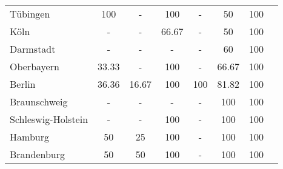 \begin{table}[H]
\begin{tabularx}{\textwidth}{Xccccccc}
            Tübingen & 100 & - & 100 & - & 50 & 100 \\
            Köln & - & - & 66.67 & - & 50 & 100 \\
            Darmstadt & - & - & - & - & 60 & 100 \\
            Oberbayern & 33.33 & - & 100 & - & 66.67 & 100 \\
            Berlin & 36.36 & 16.67 & 100 & 100 & 81.82 & 100 \\
            Braunschweig & - & - & - & - & 100 & 100 \\
            Schleswig-Holstein & - & - & 100 & - & 100 & 100 \\
            Hamburg & 50 & 25 & 100 & - & 100 & 100 \\
            Brandenburg & 50 & 50 & 100 & - & 100 & 100 \\
        \bottomrule
    \end{tabularx}
\end{table}
    